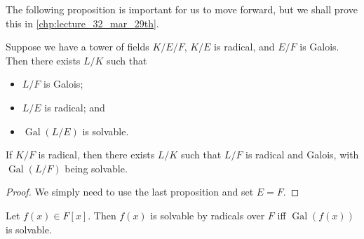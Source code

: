 \documentclass[notoc,notitlepage,nobib]{tufte-book}
\DeclareMathOperator{\Gal}{Gal}
\begin{document}
The following proposition is important for us to move forward, but we shall
prove this in \cref{chp:lecture_32_mar_29th}.

\begin{propononum}
  Suppose we have a tower of fields $K / E / F$, $K / E$ is radical, and $E / F$ 
  is Galois. Then there exists $L / K$ such that
  \begin{itemize}
    \item $L / F$ is Galois;
    \item $L / E$ is radical; and
    \item $\Gal(L / E)$ is solvable.
  \end{itemize}
\end{propononum}

\begin{crly}\label{crly:radical_extensions_have_solvable_extensions}
  If $K / F$ is radical, then there exists $L / K$ such that $L / F$ is radical
  and Galois, with $\Gal(L / F)$ being solvable.
\end{crly}

\begin{proof}
  We simply need to use the last proposition and set $E = F$.
\end{proof}

\begin{thm}\label{thm:galois_theorem}
  Let $f(x) \in F[x]$. Then $f(x)$ is solvable by radicals over $F$ iff
  $\Gal(f(x))$ is solvable.
\end{thm}
\end{document}
